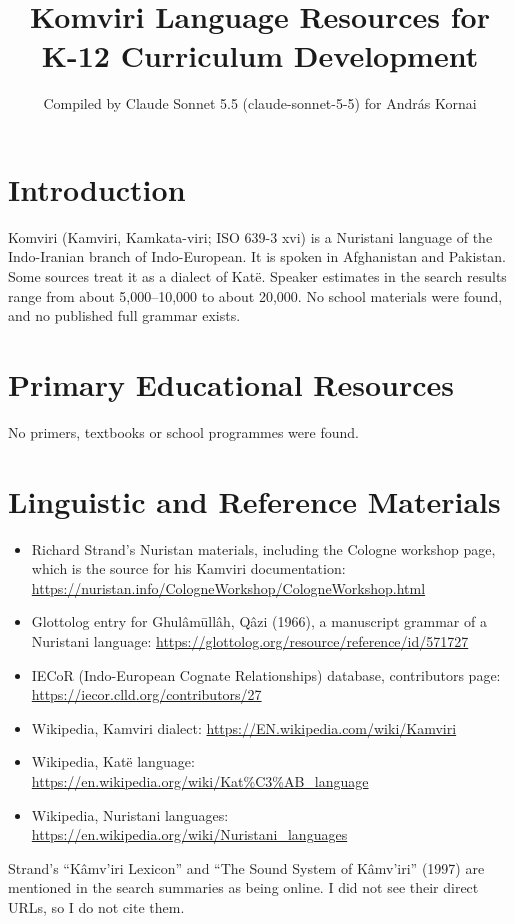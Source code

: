 \documentclass[12pt]{article}
\title{Komviri Language Resources for K-12 Curriculum Development}
\author{Compiled by Claude Sonnet 5.5 (claude-sonnet-5-5) for Andr\'as Kornai}
\date{}
\begin{document}
\maketitle

\section{Introduction}
Komviri (Kamviri, Kamkata-viri; ISO 639-3 xvi) is a Nuristani language of the Indo-Iranian branch of Indo-European. It is spoken in Afghanistan and Pakistan. Some sources treat it as a dialect of Katë. Speaker estimates in the search results range from about 5,000--10,000 to about 20,000. No school materials were found, and no published full grammar exists.

\section{Primary Educational Resources}
No primers, textbooks or school programmes were found.

\section{Linguistic and Reference Materials}
\begin{itemize}
\item Richard Strand's Nuristan materials, including the Cologne workshop page, which is the source for his Kamviri documentation: \url{https://nuristan.info/CologneWorkshop/CologneWorkshop.html}
\item Glottolog entry for Ghul\^am\=ull\^ah, Q\^azi (1966), a manuscript grammar of a Nuristani language: \url{https://glottolog.org/resource/reference/id/571727}
\item IECoR (Indo-European Cognate Relationships) database, contributors page: \url{https://iecor.clld.org/contributors/27}
\item Wikipedia, Kamviri dialect: \url{https://EN.wikipedia.com/wiki/Kamviri}
\item Wikipedia, Kat\"e language: \url{https://en.wikipedia.org/wiki/Kat%C3%AB_language}
\item Wikipedia, Nuristani languages: \url{https://en.wikipedia.org/wiki/Nuristani_languages}
\end{itemize}
Strand's ``K\^amv'iri Lexicon'' and ``The Sound System of K\^amv'iri'' (1997) are mentioned in the search summaries as being online. I did not see their direct URLs, so I do not cite them.
\end{document}
